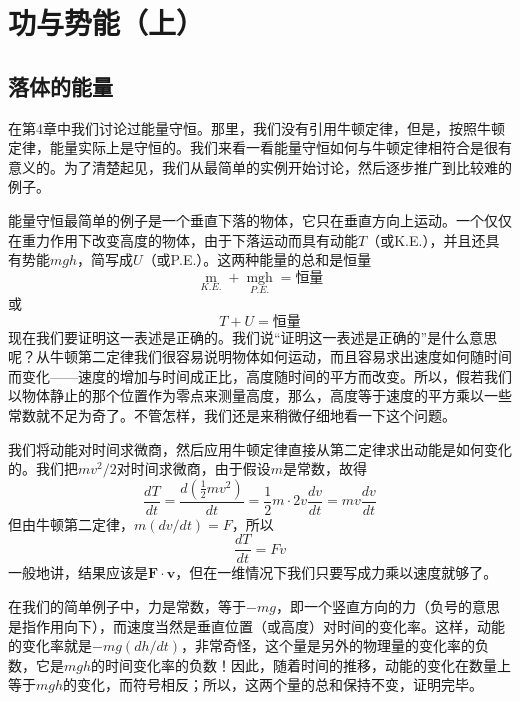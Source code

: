 \chapter{功与势能（上）}

\section{落体的能量}

在第4章中我们讨论过能量守恒。那里，我们没有引用牛顿定律，但是，按照牛顿定律，能量实际上是守恒的。我们来看一看能量守恒如何与牛顿定律相符合是很有意义的。为了清楚起见，我们从最简单的实例开始讨论，然后逐步推广到比较难的例子。

能量守恒最简单的例子是一个垂直下落的物体，它只在垂直方向上运动。一个仅仅在重力作用下改变高度的物体，由于下落运动而具有动能$T$（或K.E.），并且还具有势能$mgh$，简写成$U$（或P.E.）。这两种能量的总和是恒量
\begin{equation*}
    \mathop{\frac{1}{2}mv^2}\limits_{K.E.}+\mathop{mgh}\limits_{P.E.}=\text{恒量}
\end{equation*}
或
\begin{equation}
    \label{Eq:I:13:1}
    T+U=\text{恒量}
\end{equation}
现在我们要证明这一表述是正确的。我们说“证明这一表述是正确的”是什么意思呢？从牛顿第二定律我们很容易说明物体如何运动，而且容易求出速度如何随时间而变化——速度的增加与时间成正比，高度随时间的平方而改变。所以，假若我们以物体静止的那个位置作为零点来测量高度，那么，高度等于速度的平方乘以一些常数就不足为奇了。不管怎样，我们还是来稍微仔细地看一下这个问题。

我们将动能对时间求微商，然后应用牛顿定律直接从第二定律求出动能是如何变化的。我们把$mv^2/2$对时间求微商，由于假设$m$是常数，故得
\begin{equation}
    \label{Eq:I:13:2}
    \frac{dT}{dt}=\frac{d(\frac{1}{2}mv^2)}{dt}=\frac{1}{2}m \cdot 2v \frac{dv}{dt}=mv\frac{dv}{dt}
\end{equation}
但由牛顿第二定律，$m(dv/dt)=F$，所以
\begin{equation}
    \label{Eq:I:13:3}
    \frac{dT}{dt}=Fv
\end{equation}
一般地讲，结果应该是$\boldsymbol{F} \cdot \boldsymbol{v}$，但在一维情况下我们只要写成力乘以速度就够了。

在我们的简单例子中，力是常数，等于$-mg$，即一个竖直方向的力（负号的意思是指作用向下），而速度当然是垂直位置（或高度）对时间的变化率。这样，动能的变化率就是$-mg(dh/dt)$，非常奇怪，这个量是另外的物理量的变化率的负数，它是$mgh$的时间变化率的负数！因此，随着时间的推移，动能的变化在数量上等于$mgh$的变化，而符号相反；所以，这两个量的总和保持不变，证明完毕。

